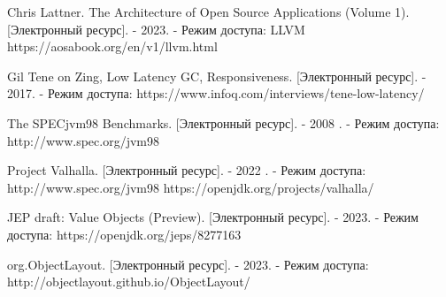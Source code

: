 \begin{flushleft}
\begin{thebibliography}{}
Chris Lattner. The Architecture of Open Source Applications (Volume 1). [Электронный ресурс]. - 2023. - Режим доступа: LLVM https://aosabook.org/en/v1/llvm.html

Gil Tene on Zing, Low Latency GC, Responsiveness. [Электронный ресурс]. - 2017. - Режим доступа: https://www.infoq.com/interviews/tene-low-latency/

The SPECjvm98 Benchmarks. [Электронный ресурс]. - 2008 . - Режим доступа: http://www.spec.org/jvm98

Project Valhalla.  [Электронный ресурс]. - 2022 . - Режим доступа: http://www.spec.org/jvm98 https://openjdk.org/projects/valhalla/

JEP draft: Value Objects (Preview). [Электронный ресурс]. - 2023. - Режим доступа: https://openjdk.org/jeps/8277163

org.ObjectLayout. [Электронный ресурс]. - 2023. - Режим доступа: http://objectlayout.github.io/ObjectLayout/

\end{thebibliography}
\end{flushleft}
\endgroup

\clearpage
